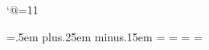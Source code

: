 %
%
%
%
%
%
\def\appendix#1#2{\centerline{\bf\uppercase{#2}}\bigskip}
\def\revdate{17 September 1994}%
\def\subsection#1{\bigskip\goodbreak
        \noindent{\bf\uppercase{#1}}\bigskip}
\def\subsubsection#1{\medskip\noindent{\bf{#1}}\medskip}
\def\nosechead#1{\medskip\noindent{\bf #1}\medskip}
\def\label#1{\relax}
\def\ORGANIZATION{}
\def\URL#1{{\tt #1}}
\def\checktags{\relax}\def\pagecheck#1{\relax}
\def\TeXsis{\TeX sis}
\def\square{\hbox{{$\sqcup$}\llap{$\sqcap$}}}   %
\def\ATunlock{\catcode`@=11}\ATunlock           %
\def\singlespaced{\relax}\def\twelvepoint{\relax}%
\long\def\vfootnote#1#2{}
\def\idx#1{#1}\def\index#1{}

%
\newskip\ttglue         \ttglue=.5em plus.25em minus.15em
\newskip\sectionminspace\sectionminspace=0pt
\newskip\sectionskip    \sectionskip=0pt
\newskip\subsectionskip \subsectionskip=0pt
%
\newcount{}        {}=\z@     %
\newcount\@firstrefnum  {} %
\newcount\@lastrefnum   {}  %
\newcount\tabnum        \tabnum=\z@     %
\newcount\fignum        \fignum=\z@     %
\newcount\eqnum         \eqnum=\z@      %

\def\@chaptID{}\def\@sectID{}           %

\newif\ifContents       \newif\ifRunningHeads


\def\meta#1{\leavevmode\hbox{$\langle$\rm #1\/$\rangle$}} %
\def\cs#1{{\tt\string#1}} \def\CS#1{{\tt\string#1}} 

\TeXquoteon
{}\baselineskip

\bye
